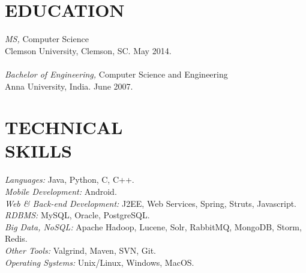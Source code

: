 \documentclass[line,margin]{res}
\begin{document}
	
	\address{2050 Southwest Expressway, Apt 82, San Jose, CA 95126}
	\address{gnanesh.che@gmail.com $\mid$ (864) 633-9988}
	
	
	\begin{resume}
		
		
		\section{EDUCATION} 
		{\sl MS,} Computer Science \\
		Clemson University, Clemson, SC. 
		May 2014.\\\\
		{\sl Bachelor of Engineering,} Computer Science and Engineering \\
		Anna University, India.
		June 2007.
		
		
		\section{TECHNICAL \\ SKILLS} {\sl Languages:} Java, Python, C, C++.\\
		{\sl Mobile Development:} Android. \\
		{\sl Web \& Back-end Development:} J2EE, Web Services, Spring, Struts, Javascript. \\
		{\sl RDBMS:} MySQL, Oracle, PostgreSQL. \\
		{\sl Big Data, NoSQL:} Apache Hadoop, Lucene, Solr, RabbitMQ, MongoDB, Storm, Redis. \\
		{\sl Other Tools:} Valgrind, Maven, SVN, Git. \\
		{\sl Operating Systems:}  Unix/Linux, Windows, MacOS.
		

\end{resume}
\end{document}
